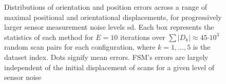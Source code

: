 \begin{frame}{}

\begin{figure}
  \vspace{0.5cm}
  \vspace{-0.75cm}\hspace{-0.75cm}
    \resizebox{6cm}{!}{}
    \resizebox{6cm}{!}{}
    \vspace{-1.6cm}
    \caption{\tiny Distributions of orientation and position errors across a
             range of maximal positional and orientational displacements, for
             progressively larger sensor measurement noise levels sd. Each
             box represents the statistics of each method for $E = 10$
             iterations over $\sum|D_k| \approx 45$$\cdot$$10^3$ random scan
             pairs for each configuration, where $k=1,\dots,5$ is the dataset
             index. Dots signify mean errors. FSM's errors are largely
             independent of the initial displacement of scans for a given level
             of sensor noise}%
    \label{fig:error_distributions}%
\end{figure}

\end{frame}
